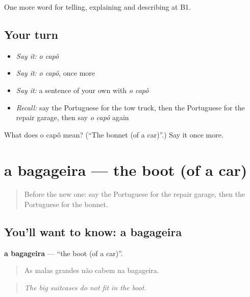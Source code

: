 \begin{grammarlens}[title={What you've built}]
One more word for telling, explaining and describing at B1.
\end{grammarlens}

\subsection*{Your turn}
\begin{itemize}
\raggedright
  \item \emph{Say it:} \emph{o capô}
  \item \emph{Say it:} \emph{o capô}, once more
  \item \emph{Say it:} a sentence of your own with \emph{o capô}
  \item \emph{Recall:} say the Portuguese for the tow truck, then the Portuguese for the repair garage, then say \emph{o capô} again
\end{itemize}

\begin{tcolorbox}[breakable,colback=teal!4,colframe=teal!35!black,title={Before you move on}]
What does o capô mean? (\textquotedblleft{}The bonnet (of a car)\textquotedblright{}.) Say it once more.
\end{tcolorbox}
\section[a bagageira]{a bagageira — the boot (of a car)}

\label{lesson:PT-C407-bagageira}



\begin{quote}
Before the new one: say the Portuguese for the repair garage, then the Portuguese for the bonnet.
\end{quote}

\subsection*{You'll want to know: a bagageira}
\textbf{a bagageira} — \textquotedblleft{}the boot (of a car)\textquotedblright{}.

\begin{quote}
As malas grandes não cabem na bagageira.
\end{quote}

\begin{quote}
\emph{The big suitcases do not fit in the boot.}
\end{quote}

